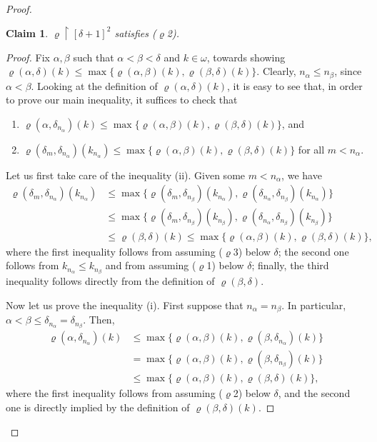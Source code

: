 \documentclass[]{amsart}
\newtheorem{claim}{Claim}[theorem]
\theoremstyle{definition}
\theoremstyle{remark}
\begin{document}
\begin{proof}
\begin{claim}
$\varrho \upharpoonright [\delta + 1]^2$ satisfies {\upshape ($\varrho$2)}.
\end{claim}
\begin{proof}
Fix $\alpha, \beta$ such that $\alpha < \beta < \delta$ and $k \in \omega$, towards showing $\varrho(\alpha, \delta)(k) \le \max\{\varrho(\alpha, \beta)(k) , \varrho(\beta, \delta)(k)\}$. Clearly, $n_\alpha \le n_\beta$, since $\alpha < \beta$. Looking at the definition of $\varrho(\alpha, \delta)(k)$, it is easy to see that, in order to prove our main inequality, it suffices to check that 
\begin{enumerate}[label={(\roman*)}]
\item $\varrho(\alpha, \delta_{n_\alpha})(k) \le \max\{\varrho(\alpha, \beta)(k) , \varrho(\beta, \delta)(k)\}$, and
\item $\varrho(\delta_m, \delta_{n_\alpha})(k_{n_\alpha}) \le \max\{\varrho(\alpha, \beta)(k) , \varrho(\beta, \delta)(k)\}$ for all $m < n_\alpha$.
\end{enumerate}
Let us first take care of the inequality (ii). Given some $m < n_{\alpha}$, we have
\begin{align*}
\varrho(\delta_m, \delta_{n_\alpha})(k_{n_\alpha}) &\le \max\{\varrho(\delta_m, \delta_{n_\beta})(k_{n_\alpha}), \varrho(\delta_{n_\alpha}, \delta_{n_\beta})(k_{n_\alpha})\}\\&\le \max\{\varrho(\delta_m, \delta_{n_\beta})(k_{n_\beta}), \varrho(\delta_{n_\alpha}, \delta_{n_\beta})(k_{n_\beta})\}\\&\le \varrho(\beta, \delta)(k) \le \max\{\varrho(\alpha, \beta)(k) , \varrho(\beta, \delta)(k)\},
\end{align*}
where the first inequality follows from assuming ($\varrho$3) below $\delta$; the second one follows from $k_{n_\alpha} \le k_{n_\beta}$ and from assuming ($\varrho$1) below $\delta$; finally, the third inequality follows directly from the definition of $\varrho(\beta, \delta)$. 

Now let us prove the inequality (i). First suppose that $n_\alpha = n_\beta$. In particular, $\alpha < \beta \le \delta_{n_\alpha} = \delta_{n_\beta}$.  Then,
\begin{align*}
\varrho(\alpha, \delta_{n_\alpha})(k) &\le \max\{\varrho(\alpha, \beta)(k), \varrho(\beta, \delta_{n_\alpha})(k)\}\\ &= \max\{\varrho(\alpha, \beta)(k), \varrho(\beta, \delta_{n_\beta})(k)\}\\&\le \max\{\varrho(\alpha, \beta)(k), \varrho(\beta, \delta)(k)\},
\end{align*}
where the first inequality follows from assuming ($\varrho$2) below $\delta$, and the second one is directly implied by the definition of $\varrho(\beta, \delta)(k)$.


\end{proof}
\end{proof}
\end{document}

